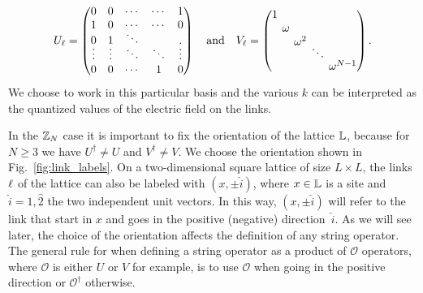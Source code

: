 \begin{equation}
    U_\link =
    \setlength\arraycolsep{5pt}
    \begin{pmatrix}
        0      & 0      & \cdots & \cdots & 1      \\
        1      & 0      & \cdots & \cdots & 0      \\[-5pt]
        0      & 1      & \ddots &        & . \\[-5pt]
        \vdots & \vdots & \ddots & \ddots & \vdots \\
        0      & 0      & \cdots & 1      & 0
    \end{pmatrix}
    \qand
    \setlength\arraycolsep{2pt}
    V_\link =
    \begin{pmatrix}
        1 \\
        & \omega \\
        &         & \omega^2 \\[-7pt]
        &         &           & \ddots \\[-2pt]
        &         &           &         & \omega^{N-1}
    \end{pmatrix}.
\end{equation}
We choose to work in this particular basis and the various $k$ can be interpreted as the quantized values of the electric field on the links.

In the $\mathbb{Z}_N$ case it is important to fix the orientation of the lattice $\mathbb{L}$, because for $N \geq 3$ we have $U^{\dagger} \neq U$ and $V^{\dagger} \neq V$.
We choose the orientation shown in Fig.~\ref{fig:link_labels}.
On a two-dimensional square lattice of size $L \times L$, the links $\ell$ of the lattice can also be labeled with $(x, \pm\hat{i})$, where $x \in \mathbb{L}$ is a site and
$\hat{i}=\hat{1}, \hat{2}$ the two independent unit vectors.
In this way, $(x, \pm\hat{i})$ will refer to the link that start in $x$ and goes in the positive (negative) direction~$\hat{i}$.
As we will see later, the choice of the orientation affects the definition of any string operator.
The general rule for when defining a string operator as a product of $\mathcal{O}$ operators, where $\mathcal{O}$ is either $U$ or $V$ for example, is to use $\mathcal{O}$ when going in the positive direction or $\mathcal{O}^{\dagger}$ otherwise.


\begin{figure}
\end{figure}


